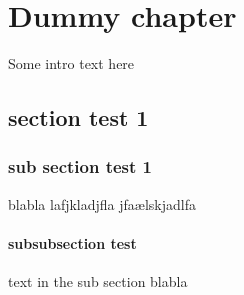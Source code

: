 \chapter{Dummy chapter}

Some intro text here

\section{section test 1}
\subsection{ sub section test 1}
blabla lafjkladjfla jfaælskjadlfa
\subsubsection{ subsubsection test }
text in the sub section blabla